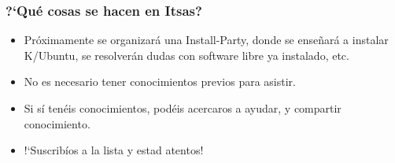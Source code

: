 \documentclass[xcolor=dvipsnames]{beamer}    %
\begin{document}
\begin{frame}
 \frametitle{?`Qu\'e cosas se hacen en Itsas?}
 \begin{itemize}
\item Pr\'oximamente se organizar\'a una Install-Party, donde se ense\~nar\'a a
instalar K/Ubuntu, se resolver\'an dudas con software libre ya instalado, etc.
\item No es necesario tener conocimientos previos para asistir.
\item Si s\'i ten\'eis conocimientos, pod\'eis acercaros a ayudar, y compartir
conocimiento.
\item !`Suscrib\'ios a la lista y estad atentos!
\end{itemize}
\end{frame}

\begin{frame}[t]
\titlepage
\end{frame}
\end{document}
